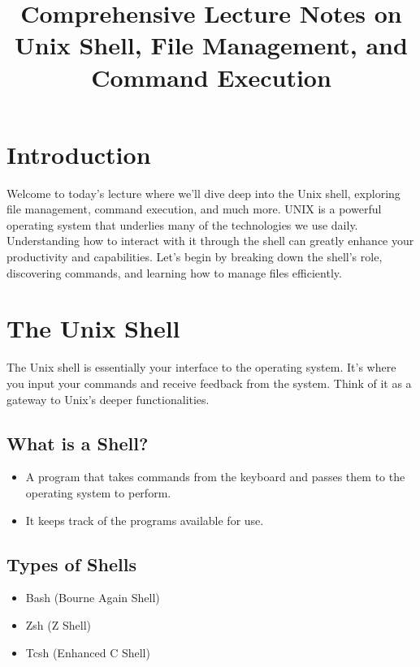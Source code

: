 \documentclass[12pt]{article}
\title{Comprehensive Lecture Notes on Unix Shell, File Management, and Command Execution}
\author{}
\date{}
\begin{document}
\maketitle
\tableofcontents
\newpage

\section{Introduction}

Welcome to today's lecture where we'll dive deep into the Unix shell, exploring file management, command execution, and much more. UNIX is a powerful operating system that underlies many of the technologies we use daily. Understanding how to interact with it through the shell can greatly enhance your productivity and capabilities. Let's begin by breaking down the shell's role, discovering commands, and learning how to manage files efficiently.

\section{The Unix Shell}

The Unix shell is essentially your interface to the operating system. It's where you input your commands and receive feedback from the system. Think of it as a gateway to Unix's deeper functionalities.

\subsection{What is a Shell?}

\begin{itemize}
    \item A program that takes commands from the keyboard and passes them to the operating system to perform.
    \item It keeps track of the programs available for use.
\end{itemize}

\subsection{Types of Shells}

\begin{itemize}
    \item Bash (Bourne Again Shell)
    \item Zsh (Z Shell)
    \item Tcsh (Enhanced C Shell)
\end{itemize}
\end{document}
